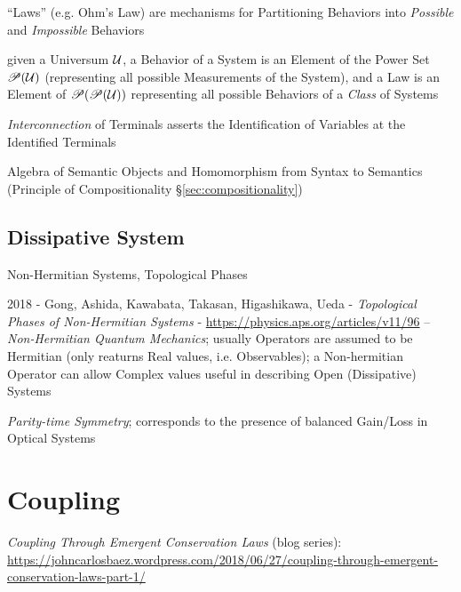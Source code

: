 
``Laws'' (e.g. Ohm's Law) are mechanisms for Partitioning Behaviors
into \emph{Possible} and \emph{Impossible} Behaviors

given a Universum $\mathcal{U}$, a Behavior of a System is an Element
of the Power Set $\mathscr{P}(\mathcal{U})$ (representing all possible
Measurements of the System), and a Law is an Element of
$\mathscr{P}(\mathscr{P}(\mathcal{U}))$ representing all possible Behaviors of a
\emph{Class} of Systems

\emph{Interconnection} of Terminals asserts the Identification of
Variables at the Identified Terminals

Algebra of Semantic Objects and Homomorphism from Syntax to Semantics
(Principle of Compositionality \S\ref{sec:compositionality})



\subsection{Dissipative System}\label{sec:dissipative_system}

Non-Hermitian Systems, Topological Phases

2018 - Gong, Ashida, Kawabata, Takasan, Higashikawa, Ueda -
\emph{Topological Phases of Non-Hermitian Systems} -
\url{https://physics.aps.org/articles/v11/96}
-- \emph{Non-Hermitian Quantum Mechanics}; usually Operators are assumed to be
Hermitian (only reaturns Real values, i.e. Observables); a Non-hermitian
Operator can allow Complex values useful in describing Open (Dissipative)
Systems

\emph{Parity-time Symmetry}; corresponds to the presence of balanced Gain/Loss
in Optical Systems



\section{Coupling}\label{sec:coupling}

\emph{Coupling Through Emergent Conservation Laws} (blog series):
\url{https://johncarlosbaez.wordpress.com/2018/06/27/coupling-through-emergent-conservation-laws-part-1/}

